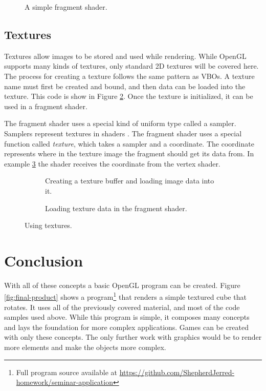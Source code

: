 \documentclass{article}
\begin{document}
\begin{figure}[h]
	
	\caption{A simple fragment shader.}
	\label{fig:fragment-shader}
\end{figure}

\subsection{Textures}
Textures allow images to be stored and used while rendering. While OpenGL supports many kinds of textures, only standard 2D textures will be covered here. The process for creating a texture follows the same pattern as VBOs. A texture name must first be created and bound, and then data can be loaded into the texture. This code is show in Figure \ref{fig:texture-init}. Once the texture is initialized, it can be used in a fragment shader.

The fragment shader uses a special kind of uniform type called a sampler. Samplers represent textures in shaders \cite{sellers2016}. The fragment shader uses a special function called \textit{texture}, which takes a sampler and a coordinate. The coordinate represents where in the texture image the fragment should get its data from. In example \ref{fig:texture-fragment} the shader receives the coordinate from the vertex shader.

\begin{figure}[h]
    \centering
    \begin{subfigure}[h]{0.49\textwidth}
        
        \caption{Creating a texture buffer and loading image data into it.}
        \label{fig:texture-init}
    \end{subfigure}
    \begin{subfigure}[h]{0.49\textwidth}
        
        \caption{Loading texture data in the fragment shader.}
        \label{fig:texture-fragment}
    \end{subfigure}
	\caption{Using textures.}
	\label{fig:texture-code}
\end{figure}

\section{Conclusion}
With all of these concepts a basic OpenGL program can be created. Figure \ref{fig:final-product} shows a program\footnote{Full program source available at \url{https://github.com/ShepherdJerred-homework/seminar-application}} that renders a simple textured cube that rotates. It uses all of the previously covered material, and most of the code samples used above. While this program is simple, it composes many concepts and lays the foundation for more complex applications. Games can be created with only these concepts. The only further work with graphics would be to render more elements and make the objects more complex.
\end{document}
